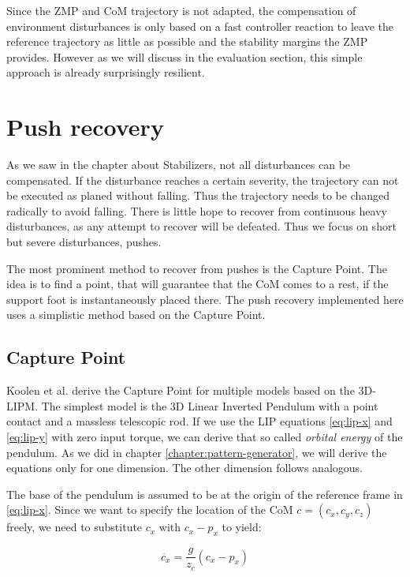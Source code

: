 \documentclass[english,ngerman]{KITreprt}
\begin{document}
Since the ZMP and CoM trajectory is not adapted, the compensation of
environment disturbances is only based on a fast controller reaction to
leave the reference trajectory as little as possible and the stability
margins the ZMP provides. However as we will discuss in the evaluation
section, this simple approach is already surprisingly resilient.

\chapter{Push recovery}\label{push-recovery}

As we saw in the chapter about Stabilizers, not all disturbances can be
compensated. If the disturbance reaches a certain severity, the
trajectory can not be executed as planed without falling. Thus the
trajectory needs to be changed radically to avoid falling. There is
little hope to recover from continuous heavy disturbances, as any
attempt to recover will be defeated. Thus we focus on short but severe
disturbances, pushes.

The most prominent method to recover from pushes is the Capture Point.
The idea is to find a point, that will guarantee that the CoM comes to a
rest, if the support foot is instantaneously placed there. The push
recovery implemented here uses a simplistic method based on the Capture
Point.

\section{Capture Point}\label{capture-point}

Koolen et al. \cite{koolen2012capturability} derive the Capture Point
for multiple models based on the 3D-LIPM. The simplest model is the 3D
Linear Inverted Pendulum with a point contact and a massless telescopic
rod. If we use the LIP equations \ref{eq:lip-x} and \ref{eq:lip-y} with
zero input torque, we can derive that so called \emph{orbital energy} of
the pendulum. As we did in chapter \ref{chapter:pattern-generator}, we
will derive the equations only for one dimension. The other dimension
follows analogous.

The base of the pendulum is assumed to be at the origin of the reference
frame in \ref{eq:lip-x}. Since we want to specify the location of the
CoM $c = (c_x, c_y, c_z)$ freely, we need to substitute $c_x$ with
$c_x - p_x$ to yield:

\begin{equation} \label{eq:lip-x-general}
\ddot{c_x} = \frac{g}{z_c} (c_x - p_x)
\end{equation}
\end{document}
